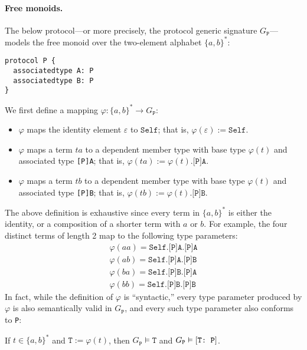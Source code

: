 \documentclass[../generics]{subfiles}
\begin{document}
\paragraph{Free monoids.} The below protocol---or more precisely, the protocol generic signature $G_\texttt{P}$---models the free monoid over the two-element alphabet $\{a,b\}^*$:
\begin{Verbatim}
protocol P {
  associatedtype A: P
  associatedtype B: P
}
\end{Verbatim}
We first define a mapping $\varphi\colon\{a,b\}^*\rightarrow G_\texttt{P}$:
\begin{itemize}
\item $\varphi$ maps the identity element $\varepsilon$ to $\texttt{Self}$; that is, $\varphi(\varepsilon):=\texttt{Self}$.
\item $\varphi$ maps a term $ta$ to a dependent member type with base type $\varphi(t)$ and associated type \texttt{[P]A}; that is, $\varphi(ta):=\texttt{$\varphi(t)$.[P]A}$.
\item $\varphi$ maps a term $tb$ to a dependent member type with base type $\varphi(t)$ and associated type \texttt{[P]B}; that is, $\varphi(tb):=\texttt{$\varphi(t)$.[P]B}$.
\end{itemize}
The above definition is exhaustive since every term in $\{a,b\}^*$ is either the identity, or a composition of a shorter term with $a$ or $b$. For example, the four distinct terms of length 2 map to the following type parameters:
\begin{gather*}
\varphi(aa)=\texttt{Self.[P]A.[P]A}\\
\varphi(ab)=\texttt{Self.[P]A.[P]B}\\
\varphi(ba)=\texttt{Self.[P]B.[P]A}\\
\varphi(bb)=\texttt{Self.[P]B.[P]B}
\end{gather*}
In fact, while the definition of $\varphi$ is ``syntactic,'' every type parameter produced by $\varphi$ is also semantically valid in $G_\texttt{P}$, and every such type parameter also conforms to \texttt{P}:
\begin{proposition}\label{monoid type lemma} If $t\in \{a,b\}^*$ and $\texttt{T}:=\varphi(t)$, then $G_\texttt{P}\vDash\texttt{T}$ and $G_\texttt{P}\vDash[\texttt{T:~P}]$.
\end{proposition}
\end{document}
